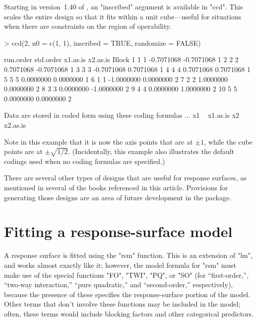 \documentclass[article,nojss]{jss}
\def\rsm{\pkg{rsm}}
\begin{document}
Starting in version~1.40 of \rsm{}, an "inscribed" argument is available in "ccd".  This scales the entire design so that it fits within a unit cube---useful for situations when there are constraints on the region of operability.
\begin{Schunk}
\begin{Sinput}
> ccd(2, n0 = c(1, 1), inscribed = TRUE, randomize = FALSE)
\end{Sinput}
\begin{Soutput}
   run.order std.order   x1.as.is   x2.as.is Block
1          1         1 -0.7071068 -0.7071068     1
2          2         2  0.7071068 -0.7071068     1
3          3         3 -0.7071068  0.7071068     1
4          4         4  0.7071068  0.7071068     1
5          5         5  0.0000000  0.0000000     1
6          1         1 -1.0000000  0.0000000     2
7          2         2  1.0000000  0.0000000     2
8          3         3  0.0000000 -1.0000000     2
9          4         4  0.0000000  1.0000000     2
10         5         5  0.0000000  0.0000000     2

Data are stored in coded form using these coding formulas ...
x1 ~ x1.as.is
x2 ~ x2.as.is
\end{Soutput}
\end{Schunk}
Note in this example that it is now the axis points that are at $\pm1$, while the cube points are at $\pm\sqrt{1/2}$. (Incidentally, this example also illustrates the default codings used when no coding formulas are specified.)

There are several other types of designs that are useful for response surfaces, as mentioned in several of the books referenced in this article.  Provisions for generating those designs are an area of future development in the \rsm{} package.



\section{Fitting a response-surface model}\label{fitting}
A response surface is fitted using the "rsm" function.  This is an extension of "lm", and works almost exactly like it; however, the model formula for "rsm" must make use of the special functions "FO", "TWI", "PQ", or "SO" (for ``first-order,'', ``two-way interaction,'' ``pure quadratic,'' and ``second-order,'' respectively), because the presence of these specifies the response-surface portion of the model.  Other terms that don't involve these functions may be included in the model; often, these terms would include blocking factors and other categorical predictors.
\end{document}

